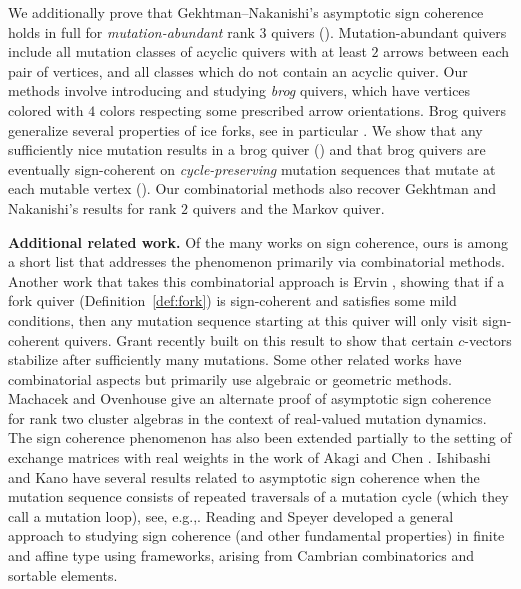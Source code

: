 \documentclass[12pt]{amsart}
\theoremstyle{definition}
\theoremstyle{remark}
\numberwithin{equation}{section}
\begin{document}
We additionally prove that Gekhtman--Nakanishi's asymptotic sign coherence holds in full for \emph{mutation-abundant} rank $3$ quivers ().  Mutation-abundant quivers include all mutation classes of acyclic quivers with at least $2$ arrows between each pair of vertices, and all classes which do not contain an acyclic quiver. Our methods involve introducing and studying \emph{brog} quivers, which have vertices colored with $4$ colors respecting some prescribed arrow orientations. Brog quivers generalize several properties of ice forks, see in particular .
We show that any sufficiently nice mutation results in a brog quiver () and that brog quivers are eventually sign-coherent on \emph{cycle-preserving} mutation sequences that mutate at each mutable vertex ().  Our combinatorial methods also recover Gekhtman and Nakanishi's results for rank $2$ quivers and the Markov quiver. 




\textbf{Additional related work.}
Of the many works on sign coherence, ours is among a short list that addresses the phenomenon primarily via combinatorial methods.  Another work that takes this combinatorial approach is Ervin \cite{ErvinRS}, showing that if a fork quiver (Definition~\ref{def:fork}) is sign-coherent and satisfies some mild conditions, then any mutation sequence starting at this quiver will only visit sign-coherent quivers. 
Grant \cite{Grant2026} recently built on this result to show that certain $c$-vectors stabilize after sufficiently many mutations.
Some other related works have combinatorial aspects but primarily use algebraic or geometric methods. Machacek and Ovenhouse \cite{MO} give an alternate proof of asymptotic sign coherence for rank two cluster algebras in the context of real-valued mutation dynamics.  The sign coherence phenomenon has also been extended partially to the setting of exchange matrices with real weights in the work of Akagi and Chen \cite{AC}. Ishibashi and Kano have several results related to asymptotic sign coherence when the mutation sequence consists of repeated traversals of a mutation cycle (which they call a mutation loop), see, e.g.,\;\cite{IshibashiKano2021,IshibashiKano2024}. %
Reading and Speyer \cite{ReadingSpeyer} developed a general approach to studying sign coherence (and other fundamental properties) in finite and affine type using frameworks, arising from Cambrian combinatorics and sortable elements.
\end{document}
